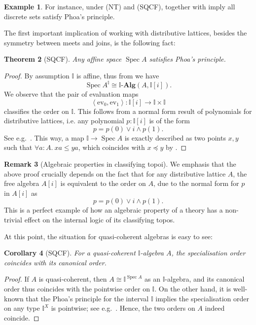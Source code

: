 \documentclass[12pt]{amsart}
\newtheorem{theorem}{Theorem}[section]
\newtheorem{corollary}[theorem]{Corollary}
\theoremstyle{definition}
\newtheorem{example}[theorem]{Example}
\newtheorem{remark}[theorem]{Remark}
\newcommand{\mb}[1]{\mathbf{#1}}
\newcommand{\mbb}[1]{\mathbb{#1}}
\newcommand{\I}{\mbb I}
\newcommand{\alg}{\text{-}\mb{Alg}}
\newcommand{\pair}[1]{\left\langle#1\right\rangle}
\newcommand{\ev}{\mathrm{ev}}
\newcommand{\fa}[2]{\forall #1\!\colon\!\!#2.\ }
\newcommand{\spec}{\operatorname{Spec}}
\begin{document}
\begin{example}
  For instance, under (NT) and (SQCF),  together with  imply all discrete sets satisfy Phoa's principle.
\end{example}

The first important implication of working with distributive lattices, besides the symmetry between meets and joins, is the following fact:

\begin{theorem}[SQCF]\label{thm:phoaaffine}
  Any affine space $\spec A$ satisfies Phoa's principle.
\end{theorem}
\begin{proof}
  By assumption $\I$ is affine, thus from  we have
  \[ \spec A^\I \cong \I\alg(A,\I[i]). \]
  We observe that the pair of evaluation maps
  \[ \pair{\ev_0,\ev_1} : \I[i] \to \I \times \I \]
  classifies the order on $\I$. This follows from a normal form result of polynomials for distributive lattices, i.e. any polynomial $p:\I[i]$ is of the form 
  \[ p = p(0) \vee i \wedge p(1). \]
  See e.g.~\cite[Thm. 10.11]{lausch2000algebra}. This way, a map $\I \to \spec A$ is exactly described as two points $x,y$ such that $\fa aA xa \le ya$, which coincides with $x \preceq y$ by .
\end{proof}

\begin{remark}[Algebraic properties in classifying topoi]\label{rem:normalalgebra}
  We emphasis that the above proof crucially depends on the fact that for any distributive lattice $A$, the free algebra $A[i]$ is equivalent to the order on $A$, due to the normal form for $p$ in $A[i]$ as 
  \[ p = p(0) \vee i \wedge p(1). \]
  This is a perfect example of how an algebraic property of a theory has a non-trivial effect on the internal logic of its classifying topos.
\end{remark}

At this point, the situation for quasi-coherent algebras is easy to see:

\begin{corollary}[SQCF]
  For a quasi-coherent $\I$-algebra $A$, the specialisation order coincides with its canonical order.
\end{corollary}
\begin{proof}
  If $A$ is quasi-coherent, then $A \cong \I^{\spec A}$ as an $\I$-algebra, and its canonical order thus coincides with the pointwise order on $\I$. On the other hand, it is well-known that the Phoa's principle for the interval $\I$ implies the specialisation order on any type $\I^X$ is pointwise; see e.g.~\cite[Thm. 4.2.1]{hyland2006first}. Hence, the two orders on $A$ indeed coincide.
\end{proof}
\end{document}
